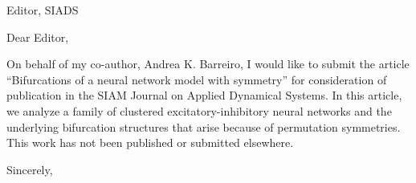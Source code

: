 \documentclass[11pt]{letter}
\begin{document}
\address{Ross Parker \\
Department of Mathematics \\
Southern Methodist University \\
Dallas, TX 75275 \\
\texttt{rhparker@smu.edu}}%
\signature{Ross Parker}
\begin{letter}{Editor, SIADS}

\opening{Dear Editor,}

On behalf of my co-author, Andrea K. Barreiro, I would like to submit the article ``Bifurcations of a neural network model with symmetry'' for consideration of publication in the SIAM Journal on Applied Dynamical Systems. In this article, we analyze a family of clustered excitatory-inhibitory neural networks and the underlying bifurcation structures that arise because of permutation symmetries. This work has not been published or submitted elsewhere.


\closing{Sincerely,}

\end{letter}
\end{document}

